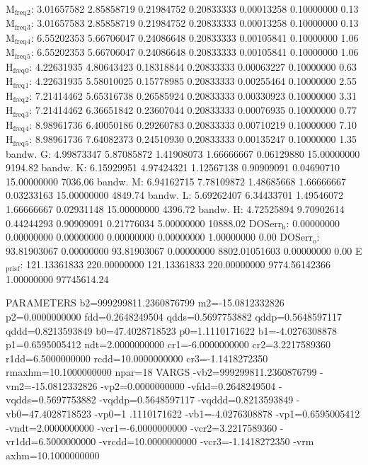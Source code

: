 \documentclass[11pt]{article}
\begin{document}
M\(_{\text{freq}}\)\(_{\text{2}}\):   3.01657582   2.85858719   0.21984752   0.20833333   0.00013258   0.10000000         0.13
M\(_{\text{freq}}\)\(_{\text{3}}\):   3.01657583   2.85858719   0.21984752   0.20833333   0.00013258   0.10000000         0.13
M\(_{\text{freq}}\)\(_{\text{4}}\):   6.55202353   5.66706047   0.24086648   0.20833333   0.00105841   0.10000000         1.06
M\(_{\text{freq}}\)\(_{\text{5}}\):   6.55202353   5.66706047   0.24086648   0.20833333   0.00105841   0.10000000         1.06
H\(_{\text{freq}}\)\(_{\text{0}}\):   4.22631935   4.80643423   0.18318844   0.20833333   0.00063227   0.10000000         0.63
H\(_{\text{freq}}\)\(_{\text{1}}\):   4.22631935   5.58010025   0.15778985   0.20833333   0.00255464   0.10000000         2.55
H\(_{\text{freq}}\)\(_{\text{2}}\):   7.21414462   5.65316738   0.26585924   0.20833333   0.00330923   0.10000000         3.31
H\(_{\text{freq}}\)\(_{\text{3}}\):   7.21414462   6.36651842   0.23607044   0.20833333   0.00076935   0.10000000         0.77
H\(_{\text{freq}}\)\(_{\text{4}}\):   8.98961736   6.40050186   0.29260783   0.20833333   0.00710219   0.10000000         7.10
H\(_{\text{freq}}\)\(_{\text{5}}\):   8.98961736   7.64082373   0.24510930   0.20833333   0.00135247   0.10000000         1.35
bandw. G:   4.99873347   5.87085872   1.41908073   1.66666667   0.06129880  15.00000000      9194.82
bandw. K:   6.15929951   4.97424321   1.12567138   0.90909091   0.04690710  15.00000000      7036.06
bandw. M:   6.94162715   7.78109872   1.48685668   1.66666667   0.03233163  15.00000000      4849.74
bandw. L:   5.69262407   6.34433701   1.49546072   1.66666667   0.02931148  15.00000000      4396.72
bandw. H:   4.72525894   9.70902614   0.44244293   0.90909091   0.21776034   5.00000000     10888.02
DOSerr\(_{\text{h}}\):   0.00000000   0.00000000   0.00000000   0.00000000   0.00000000   1.00000000         0.00
DOSerr\(_{\text{o}}\):  93.81903067   0.00000000  93.81903067   0.00000000 8802.01051603   0.00000000         0.00
E\(_{\text{pris}}\)\(_{\text{f}}\): 121.13361833 220.00000000 121.13361833 220.00000000 9774.56142366   1.00000000  97745614.24

PARAMETERS
  b2=999299811.2360876799 m2=-15.0812332826 p2=0.0000000000 fdd=0.2648249504 qdds=0.5697753882 qddp=0.5648597117 qddd=0.8213593849 b0=47.4028718523 p0=1.1110171622 b1=-4.0276308878 p1=0.6595005412 ndt=2.0000000000 cr1=-6.0000000000 cr2=3.2217589360 r1dd=6.5000000000 rcdd=10.0000000000 cr3=-1.1418272350 rmaxhm=10.1000000000 npar=18 
VARGS
    -vb2=999299811.2360876799 -vm2=-15.0812332826 -vp2=0.0000000000 -vfdd=0.2648249504 -vqdds=0.5697753882 -vqddp=0.5648597117 -vqddd=0.8213593849 -vb0=47.4028718523 -vp0=1
.1110171622 -vb1=-4.0276308878 -vp1=0.6595005412 -vndt=2.0000000000 -vcr1=-6.0000000000 -vcr2=3.2217589360 -vr1dd=6.5000000000 -vrcdd=10.0000000000 -vcr3=-1.1418272350 -vrm
axhm=10.1000000000 
\end{document}
